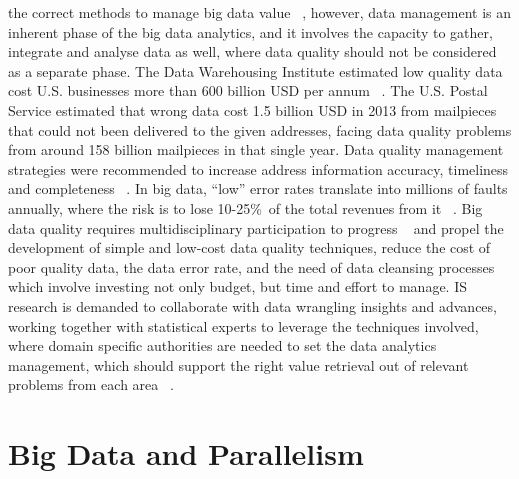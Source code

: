 the correct methods to manage big data value ~\cite{Lavalle2011}, however, data management is an
inherent phase of the big data analytics, and it involves the capacity to gather, integrate
and analyse data as well, where data quality should not be considered as a separate
phase.
The Data Warehousing Institute estimated low quality data cost U.S. businesses
more than 600 billion USD per annum ~\cite{Eckerson2002}. The U.S. Postal Service estimated that
wrong data cost 1.5 billion USD in 2013 from mailpieces that could not been delivered
to the given addresses, facing data quality problems from around 158 billion mailpieces
in that single year. Data quality management strategies were recommended to increase
address information accuracy, timeliness and completeness ~\cite{USAPostService2014}. In big data, “low”
error rates translate into millions of faults annually, where the risk is to lose 10-25\%\ of
the total revenues from it ~\cite{Eckerson2002}.
Big data quality requires multidisciplinary participation to progress ~\cite{Hazen2014} and propel the development of simple and low-cost data quality techniques, reduce the cost of
poor quality data, the data error rate, and the need of data cleansing processes which
involve investing not only budget, but time and effort to manage. IS research is demanded to collaborate with data wrangling insights and advances, working together
with statistical experts to leverage the techniques involved, where domain specific authorities are needed to set the data analytics management, which should support the
right value retrieval out of relevant problems from each area ~\cite{Hazen2014}.

\section{Big Data and Parallelism}

